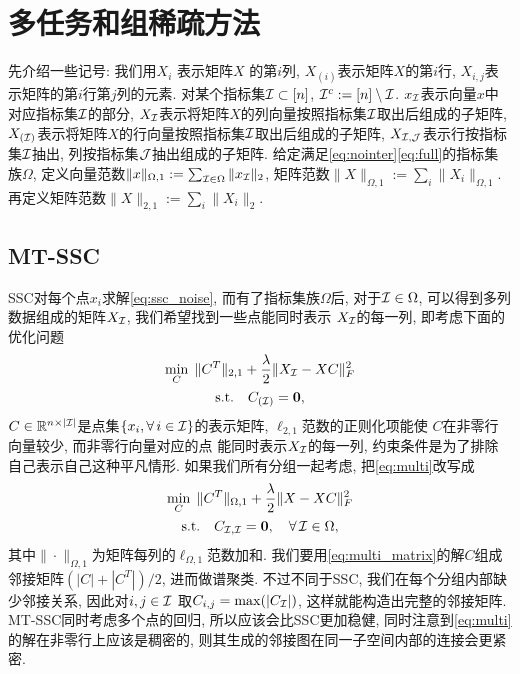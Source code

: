 \section{多任务和组稀疏方法}
先介绍一些记号: 我们用\(X_i\) 表示矩阵\(X\) 的第\(i\)列,
\(X_{(i)}\)表示矩阵\(X\)的第\(i\)行,
\(X_{i,j}\)表示矩阵的第\(i\)行第\(j\)列的元素.
对某个指标集\(\mathcal{I}\subset [n]\), \(\mathcal{I}^c:=[n]\setminus \mathcal{I}\).
\(x_{\mathcal{I}}\)表示向量\(x\)中对应指标集\(\mathcal{I}\)的部分,
\(X_{\mathcal{I}}\)表示将矩阵\(X\)的列向量按照指标集\(\mathcal{I}\)取出后组成的子矩阵, 
\(X_{(\mathcal{I})}\)表示将矩阵\(X\)的行向量按照指标集\(\mathcal{I}\)取出后组成的子矩阵,
\(X_{\mathcal{I}, \mathcal{J}}\)表示行按指标集\(\mathcal{I}\)抽出, 列按指标集\(\mathcal{J}\)抽出组成的子矩阵. 
给定满足\eqref{eq:nointer}\eqref{eq:full}的指标集族\(\Omega\),
定义向量范数\(\|x\|_{\Omega, 1}:=\sum_{\mathcal{I} \in \Omega} \|x_{\mathcal{I}}\|_2\),
矩阵范数\(\|X\|_{\Omega, 1}:=\sum_{i} \|X_i\|_{\Omega, 1}\).
再定义矩阵范数\(\|X\|_{2, 1}:=\sum_{i} \|X_i\|_2\).

\subsection{MT-SSC}

SSC对每个点\(x_i\)求解\eqref{eq:ssc_noise},
而有了指标集族\(\Omega\)后, 对于\(\mathcal{I}\in \Omega\),
可以得到多列数据组成的矩阵\(X_{\mathcal{I}}\), 我们希望找到一些点能同时表示
\(X_{\mathcal{I}}\)的每一列, 即考虑下面的优化问题
\begin{equation}\label{eq:multi}
  \begin{gathered}
    \min_{C}\; \|C^T\|_{2, 1} + \frac{\lambda}{2} \|X_{\mathcal{I}} - XC\|_F^2\\
    \text{s.t.} \quad C_{(\mathcal{I})} = \mathbf{0},
  \end{gathered}
\end{equation}
\(C \in \mathbb{R}^{n \times |\mathcal{I}|}\)是点集\(\{x_i, \forall\, i\in \mathcal{I}\}\)的表示矩阵,
\(\ell_{2,1}\)范数的正则化项能使 \(C\)在非零行向量较少, 而非零行向量对应的点
能同时表示\(X_{\mathcal{I}}\)的每一列, 约束条件是为了排除自己表示自己这种平凡情形.
如果我们所有分组一起考虑, 把\eqref{eq:multi}改写成
\begin{equation}\label{eq:multi_matrix}
  \begin{gathered}
    \min_C\; \|C^T\|_{\Omega, 1} + \frac{\lambda}{2} \|X-XC\|_F^2 \\
    \text{s.t.} \quad C_{\mathcal{I}, \mathcal{I}} = \mathbf{0}, \quad \forall \, \mathcal{I} \in
    \Omega,
  \end{gathered}
\end{equation}
其中\(\|\cdot\|_{\Omega, 1}\)为矩阵每列的\(\ell_{\Omega, 1}\)范数加和.
我们要用\eqref{eq:multi_matrix}的解\(C\)组成邻接矩阵\((|C|+|C^T|)/2\),
进而做谱聚类. 不过不同于SSC, 我们在每个分组内部缺少邻接关系,
因此对\(i, j\in\mathcal{I}\) 取\(C_{i, j} = \max(|C_{\mathcal{I}}|)\), 这样就能构造出完整的邻接矩阵.
MT-SSC同时考虑多个点的回归, 所以应该会比SSC更加稳健, 同时注意到\eqref{eq:multi}
的解在非零行上应该是稠密的, 则其生成的邻接图在同一子空间内部的连接会更紧密.

